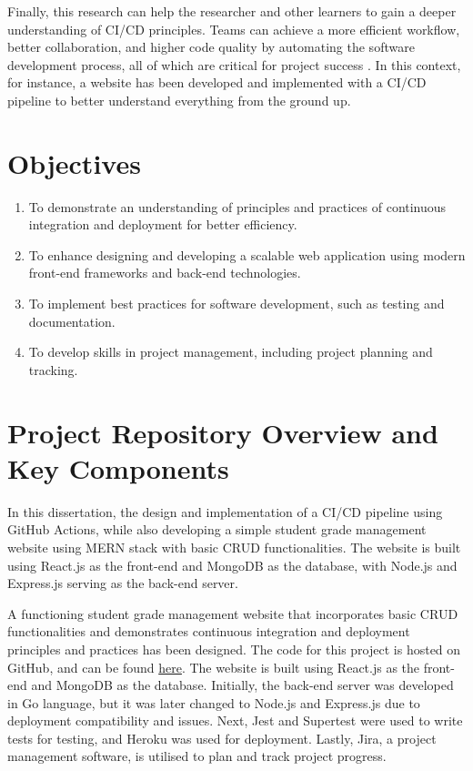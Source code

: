 Finally, this research can help the researcher and other learners to gain a deeper understanding of CI/CD principles. Teams can achieve a more efficient workflow, better collaboration, and higher code quality by automating the software development process, all of which are critical for project success \cite{sander}. In this context, for instance, a website has been developed and implemented with a CI/CD pipeline to better understand everything from the ground up.

\section{Objectives}
\begin{enumerate}
  \item To demonstrate an understanding of principles and practices of continuous integration and deployment for better efficiency.
  \item To enhance designing and developing a scalable web application using modern front-end frameworks and back-end technologies.
  \item To implement best practices for software development, such as testing and documentation.
  \item To develop skills in project management, including project planning and tracking.
\end{enumerate}

\section{Project Repository Overview and Key Components}
In this dissertation, the design and implementation of a CI/CD pipeline using GitHub Actions, while also developing a simple student grade management website using MERN stack with basic CRUD functionalities. The website is built using React.js as the front-end and MongoDB as the database, with Node.js and Express.js serving as the back-end server.

A functioning student grade management website that incorporates basic CRUD functionalities and demonstrates continuous integration and deployment principles and practices has been designed. The code for this project is hosted on GitHub, and can be found \href{https://github.com/gabhang/final-year-project}{here}. The website is built using React.js as the front-end and MongoDB as the database. Initially, the back-end server was developed in Go language, but it was later changed to Node.js and Express.js due to deployment compatibility and issues. Next, Jest and Supertest were used to write tests for testing, and Heroku was used for deployment. Lastly, Jira, a project management software, is utilised to plan and track project progress.

